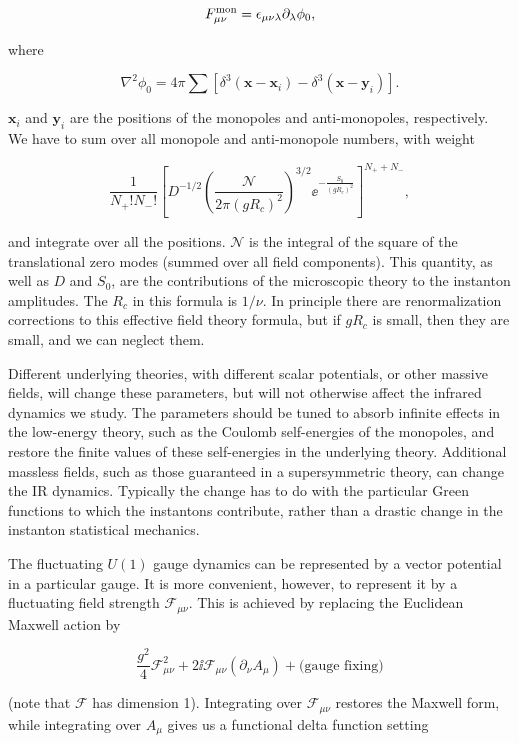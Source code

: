 \[
  F^{\rm mon}_{\mu\nu}=\epsilon_{\mu\nu\lambda}\partial_\lambda\phi_0,
\]

where

\[
  \nabla^2\phi_0=4\pi\sum
  \left[\delta^3(\mathbf x-\mathbf x_i)-\delta^3(\mathbf x-\mathbf y_i)\right].
\]

$\mathbf x_i$ and $\mathbf y_i$ are the positions of the monopoles and anti-monopoles,
respectively. We have to sum over all monopole and anti-monopole numbers, with
weight

\[
  \frac{1}{N_+!N_-!}
  \left[D^{-1/2}
  \left(\frac{\mathcal N}{2\pi(gR_c)^2}\right)^{3/2}
  \ee^{-\frac{S_0}{(gR_c)^2}}\right]^{N_++N_-},
\]

and integrate over all the positions. $\mathcal N$ is the integral of the
square of the translational zero modes (summed over all field components). This
quantity, as well as $D$ and $S_0$, are the contributions of the microscopic
theory to the instanton amplitudes. The $R_c$ in this formula is $1/\nu$. In
principle there are renormalization corrections to this effective field theory
formula, but if $gR_c$ is small, then they are small, and we can neglect them.

Different underlying theories, with different scalar potentials, or other
massive fields, will change these parameters, but will not otherwise affect the
infrared dynamics we study. The parameters should be tuned to absorb infinite
effects in the low-energy theory, such as the Coulomb self-energies of the
monopoles, and restore the finite values of these self-energies in the underlying
theory. Additional massless fields, such as those guaranteed in a supersymmetric
theory, can change the IR dynamics. Typically the change has to do with the
particular Green functions to which the instantons contribute, rather than a
drastic change in the instanton statistical mechanics.

The fluctuating $U(1)$ gauge dynamics can be represented by a vector potential in
a particular gauge. It is more convenient, however, to represent it by a
fluctuating field strength $\mathcal F_{\mu\nu}$. This is achieved by replacing
the Euclidean Maxwell action by

\[
\frac{g^2}{4}\mathcal F_{\mu\nu}^{2}
  +2\ii\mathcal F_{\mu\nu}(\partial_\nu A_\mu)
  +\text{(gauge fixing)}
\]

(note that $\mathcal F$ has dimension 1). Integrating over $\mathcal F_{\mu\nu}$
restores the Maxwell form, while integrating over $A_\mu$ gives us a functional
delta function setting

